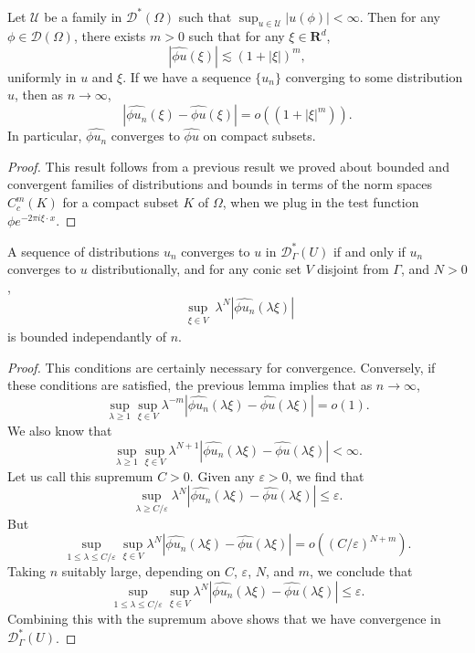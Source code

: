 \begin{lemma}
    Let $\mathcal{U}$ be a family in $\mathcal{D}^*(\Omega)$ such that $\sup_{u \in \mathcal{U}} |u(\phi)| < \infty$. Then for any $\phi \in \mathcal{D}(\Omega)$, there exists $m > 0$ such that for any $\xi \in \mathbf{R}^d$,
    \[ |\widehat{\phi u}(\xi)| \lesssim (1 + |\xi|)^m, \]
    uniformly in $u$ and $\xi$. If we have a sequence $\{ u_n \}$ converging to some distribution $u$, then as $n \to \infty$,
    \[ |\widehat{\phi u_n}(\xi) - \widehat{\phi u}(\xi)| = o((1 + |\xi|^m)). \]
    In particular, $\widehat{\phi u_n}$ converges to $\widehat{\phi u}$ on compact subsets.
\end{lemma}
\begin{proof}
    This result follows from a previous result we proved about bounded and convergent families of distributions and bounds in terms of the norm spaces $C^m_c(K)$ for a compact subset $K$ of $\Omega$, when we plug in the test function $\phi e^{-2 \pi i \xi \cdot x}$.
\end{proof}

\begin{theorem}
    A sequence of distributions $u_n$ converges to $u$ in $\mathcal{D}^*_\Gamma(U)$ if and only if $u_n$ converges to $u$ distributionally, and for any conic set $V$ disjoint from $\Gamma$, and $N > 0$,
    \[ \sup_{\substack{\xi \in V}} \lambda^N |\widehat{\phi u_n}(\lambda \xi)| \]
    is bounded independantly of $n$.
\end{theorem}
\begin{proof}
    This conditions are certainly necessary for convergence. Conversely, if these conditions are satisfied, the previous lemma implies that as $n \to \infty$,
    \[ \sup_{\lambda \geq 1} \sup_{\xi \in V} \lambda^{-m} |\widehat{\phi u_n}(\lambda \xi) - \widehat{\phi u}(\lambda \xi)| = o(1). \]
    We also know that
    \[ \sup_{\lambda \geq 1} \sup_{\xi \in V} \lambda^{N+1} |\widehat{\phi u_n}(\lambda \xi) - \widehat{\phi u}(\lambda \xi)| < \infty. \]
    Let us call this supremum $C > 0$. Given any $\varepsilon > 0$, we find that
    \[ \sup_{\lambda \geq C/\varepsilon} \lambda^N |\widehat{\phi u_n}(\lambda \xi) - \widehat{\phi u}(\lambda \xi)| \leq \varepsilon. \]
    But
    \[ \sup_{1 \leq \lambda \leq C/\varepsilon} \sup_{\xi \in V} \lambda^N |\widehat{\phi u_n}(\lambda \xi) - \widehat{\phi u}(\lambda \xi)| = o((C/\varepsilon)^{N+m}). \]
    Taking $n$ suitably large, depending on $C$, $\varepsilon$, $N$, and $m$, we conclude that
    \[ \sup_{1 \leq \lambda \leq C/\varepsilon} \sup_{\xi \in V} \lambda^N |\widehat{\phi u_n}(\lambda \xi) - \widehat{\phi u}(\lambda \xi)| \leq \varepsilon. \]
    Combining this with the supremum above shows that we have convergence in $\mathcal{D}^*_\Gamma(U)$.
\end{proof}


